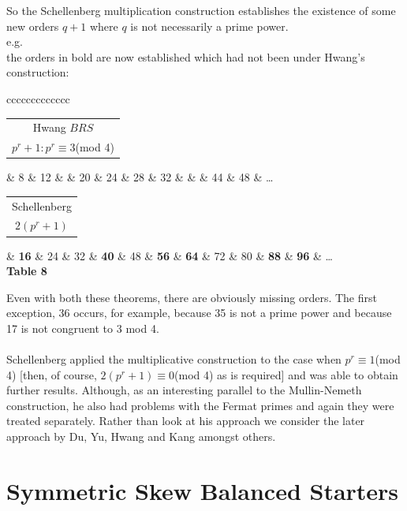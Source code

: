\documentclass[
  12pt,
  a4paper]{book}
\begin{document}
So the Schellenberg multiplication construction establishes the
existence of some new orders \(q+1\) where \(q\) is not necessarily a
prime power.\\
e.g.\\
the orders in bold are now established which had not been under Hwang's
construction:

{\textbar c\textbar c\textbar c\textbar c\textbar c\textbar c\textbar c\textbar c\textbar c\textbar c\textbar c\textbar c\textbar c\textbar{}}

\begin{longtable}[]{@{}c@{}}
\toprule
\endhead
Hwang \(BRS\)\tabularnewline
\(p^r + 1: p^r \equiv 3\)(mod 4)\tabularnewline
\bottomrule
\end{longtable}

\& 8 \& 12 \& \& 20 \& 24 \& 28 \& 32 \& \& \& 44 \& 48 \& \ldots{}\\

\begin{longtable}[]{@{}c@{}}
\toprule
\endhead
Schellenberg\tabularnewline
\(2(p^r + 1)\)\tabularnewline
\bottomrule
\end{longtable}

\& \textbf{16} \& 24 \& 32 \& \textbf{40} \& 48 \& \textbf{56} \&
\textbf{64} \& 72 \& 80 \& \textbf{88} \& \textbf{96} \& \ldots{}\\

\textbf{Table 8}

Even with both these theorems, there are obviously missing orders. The
first exception, 36 occurs, for example, because 35 is not a prime power
and because 17 is not congruent to 3 mod 4.\\
~\\
Schellenberg applied the multiplicative construction to the case when
\(p^r \equiv 1\)(mod 4) {[}then, of course, \(2(p^r+1) \equiv 0\)(mod 4)
as is required{]} and was able to obtain further results. Although, as
an interesting parallel to the Mullin-Nemeth construction, he also had
problems with the Fermat primes and again they were treated separately.
Rather than look at his approach we consider the later approach by Du,
Yu, Hwang and Kang amongst others.

\hypertarget{symmetric-skew-balanced-starters}{%
\section{Symmetric Skew Balanced
Starters}\label{symmetric-skew-balanced-starters}}
\end{document}
